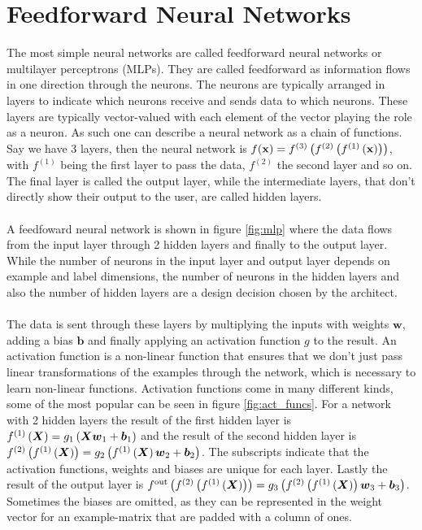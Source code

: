 \section{Feedforward Neural Networks} \label{sec:feedforward_nn}
The most simple neural networks are called feedforward neural networks or multilayer perceptrons (MLPs). They are called feedforward as information flows in one direction through the neurons. The neurons are typically arranged in layers to indicate which neurons receive and sends data to which neurons. These layers are typically vector-valued with each element of the vector playing the role as a neuron. As such one can describe a neural network as a chain of functions. Say we have 3 layers, then the neural network is $f(\mathbf{x}) = f^{(3)}\left (f^{(2)}\left (f^{(1)}\left (\mathbf{x}\right)\right)\right)$, with $f^{(1)}$ being the first layer to pass the data, $f^{(2)}$ the second layer and so on. The final layer is called the output layer, while the intermediate layers, that don't directly show their output to the user, are called hidden layers. \\
\\
A feedfoward neural network is shown in figure \ref{fig:mlp} where the data flows from the input layer through 2 hidden layers and finally to the output layer. While the number of neurons in the input layer and output layer depends on example and label dimensions, the number of neurons in the hidden layers and also the number of hidden layers are a design decision chosen by the architect. \\
\\
The data is sent through these layers by multiplying the inputs with weights $\boldsymbol{w}$, adding a bias $\boldsymbol{b}$ and finally applying an activation function $g$ to the result. An activation function is a non-linear function that ensures that we don't just pass linear transformations of the examples through the network, which is necessary to learn non-linear functions. Activation functions come in many different kinds, some of the most popular can be seen in figure \ref{fig:act_funcs}. For a network with 2 hidden layers the result of the first hidden layer is $f^{(1)}\left (\boldsymbol{X}\right) = g_1 \left (\boldsymbol{X} \boldsymbol{w}_1 + \boldsymbol{b}_1\right)$ and the result of the second hidden layer is $f^{(2)} \left (f^{(1)}\left (\boldsymbol{X}\right)\right) = g_2 \left (f^{(1)}\left (\boldsymbol{X}\right) \boldsymbol{w}_2 + \boldsymbol{b}_2\right)$. The subscripts indicate that the activation functions, weights and biases are unique for each layer. Lastly the result of the output layer is $f^{\text{out}} \left (f^{(2)} \left (f^{(1)}\left (\boldsymbol{X}\right)\right)\right) = g_3 \left (f^{(2)} \left (f^{(1)}\left (\boldsymbol{X}\right)\right) \boldsymbol{w}_3 + \boldsymbol{b}_3\right)$. Sometimes the biases are omitted, as they can be represented in the weight vector for an example-matrix that are padded with a column of ones. \\
